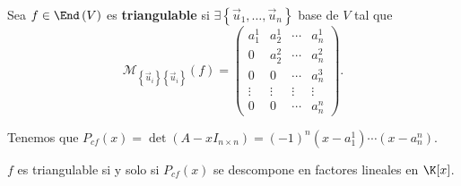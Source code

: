 \begin{fdefinition}[]
	\normalfont Sea $\displaystyle f \in \End\left(V\right) $ es \textbf{triangulable} si $\displaystyle \exists \left\{ \vec{u}_{1}, \ldots, \vec{u}_{n}\right\}  $ base de $\displaystyle V $ tal que 
	\[\mathcal{M}_{ \left\{ \vec{u}_{i}\right\} \left\{ \vec{u}_{i}\right\} }\left(f\right) =  \begin{pmatrix} a^{1}_{1} & a^{1}_{2} & \cdots & a^{1}_{n} \\
		0 & a^{2}_{2} & \cdots & a^{2}_{n} \\
0 & 0 & \cdots & a^{3}_{n} \\
\vdots & \vdots & \vdots & \vdots \\
0 & 0 & \cdots & a^{n}_{n}\end{pmatrix} .\]
\end{fdefinition}
\begin{observation}
\normalfont Tenemos que $\displaystyle P_{cf}\left(x\right) = \det\left(A - x I_{n \times n}\right)= \left(-1\right)^{n}\left(x - a^{1}_{1}\right) \cdots \left(x- a^{n}_{n}\right) $.
\end{observation}
\begin{ftheorem}[]
	\normalfont $\displaystyle f $ es triangulable si y solo si $\displaystyle P_{cf}\left(x\right) $ se descompone en factores lineales en $\displaystyle \K[x] $.
\end{ftheorem}
